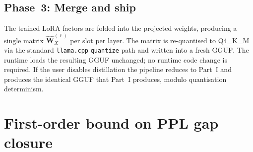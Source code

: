\documentclass[11pt]{article}
\providecommand{\Wmat}{\mathbf{W}}
\begin{document}
\subsection{Phase~3: Merge and ship}
\label{sec:phase3}
The trained LoRA factors are folded into the projected weights,
producing a single matrix $\hat{\Wmat}_X^{(\ell)}$ per slot per layer.
The matrix is re-quantised to Q4\_K\_M via the standard
\texttt{llama.cpp} \texttt{quantize} path and written into a fresh GGUF.
The runtime loads the resulting GGUF unchanged; no runtime code change
is required. If the user disables distillation the pipeline reduces to
Part~I and produces the identical GGUF that Part~I produces, modulo
quantisation determinism.

\section{First-order bound on PPL gap closure}
\label{sec:gapbound}
\end{document}
